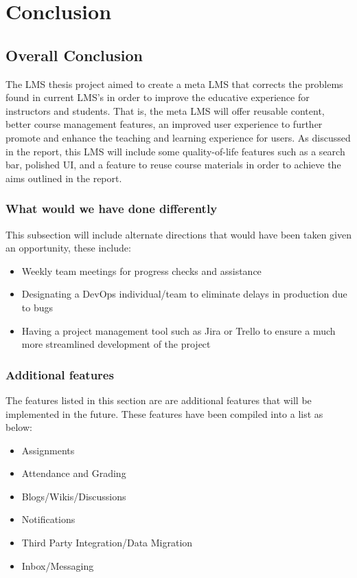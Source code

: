 \chapter{Conclusion}\label{ch:conclusion}










\section{Overall Conclusion}
The LMS thesis project aimed to create a meta LMS that corrects the problems found in current LMS’s 
in order to improve the educative experience for instructors and students. That is, the meta LMS will 
offer reusable content, better course management features, an improved user experience to further promote 
and enhance the teaching and learning experience for users. As discussed in the report, this LMS will include 
some quality-of-life features such as a search bar, polished UI, and a feature to reuse course materials in order 
to achieve the aims outlined in the report.


\subsection{What would we have done differently}
This subsection will include alternate directions that would have been taken given an opportunity, these include:

\begin{itemize}
    \item Weekly team meetings for progress checks and assistance
    \item Designating a DevOps individual/team to eliminate delays in production due to bugs
    \item Having a project management tool such as Jira or Trello to ensure a much more streamlined development of the project
\end{itemize}

\subsection{Additional features}
The features listed in this section are are additional features that will be implemented in the future. These features have been compiled into a list as below: 

\begin{itemize}
  \item Assignments
  \item Attendance and Grading
  \item Blogs/Wikis/Discussions
  \item Notifications
  \item Third Party Integration/Data Migration
  \item Inbox/Messaging
\end{itemize}

